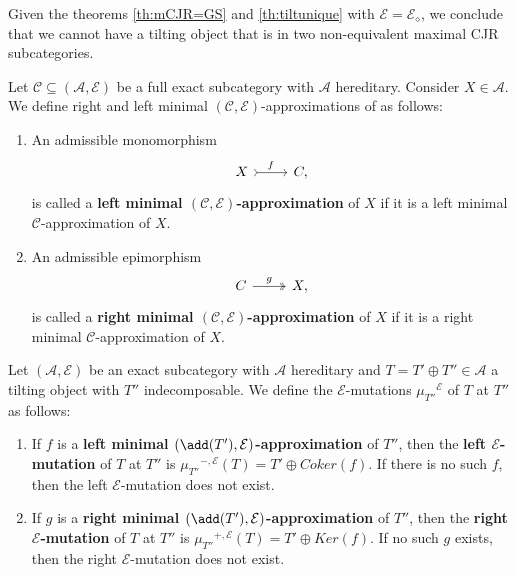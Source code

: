 Given the theorems \ref{th:mCJR=GS} and \ref{th:tiltunique} with $\mathcal{E} = \mathcal{E}_\diamond$, we conclude that we cannot have a tilting object that is in two non-equivalent maximal CJR subcategories.  

\begin{definition}
Let $\mathscr{C} \subseteq (\mathscr{A},\mathcal{E})$ be a full exact subcategory with $\mathscr{A}$ hereditary. Consider $X \in \mathscr{A}$. We define right and left minimal $(\mathscr{C},\mathcal{E})$-approximations of as follows:

\begin{enumerate}
    \item An admissible monomorphism 
    \[\begin{tikzcd}
	X & C,
	\arrow["f",tail,from=1-1, to=1-2]
	\end{tikzcd} \]
is called a \textbf{left minimal $(\mathscr{C},\mathcal{E})$-approximation} of $X$ if it is a left minimal $\mathscr{C}$-approximation of $X$. 

    \item An admissible epimorphism 
    \[\begin{tikzcd}
	C & X,
	\arrow["g",two heads,from=1-1, to=1-2]
	\end{tikzcd} \]
is called a \textbf{right minimal $(\mathscr{C},\mathcal{E})$-approximation} of $X$ if it is a right minimal $\mathscr{C}$-approximation of $X$. 
\end{enumerate}
\end{definition}

\begin{definition}
Let $(\mathscr{A},\mathcal{E})$ be an exact subcategory with $\mathscr{A}$ hereditary and $T = T' \oplus T''  \in \mathscr{A}$ a tilting object with $T''$ indecomposable. We define the $\mathcal{E}$-mutations ${\mu_{T''}}^\mathcal{E}$ of $T$ at $T''$ as follows: 

\begin{enumerate}
    \item If $f$ is a \textbf{left minimal $(\add(T'),\mathcal{E})$-approximation} of $T''$, then the \textbf{left $\mathcal{E}$-mutation} of $T$ at $T''$ is ${\mu_{T''}}^{-,\mathcal{E}}(T) = T' \oplus Coker(f)$. If there is no such $f$, then the left $\mathcal{E}$-mutation does not exist.
    \item If $g$ is a \textbf{right minimal $(\add(T'),\mathcal{E})$-approximation} of $T''$, then the \textbf{right $\mathcal{E}$-mutation} of $T$ at $T''$ is ${\mu_{T''}}^{+,\mathcal{E}}(T) = T' \oplus Ker(f)$. If no such $g$ exists, then the right $\mathcal{E}$-mutation does not exist.
\end{enumerate}

\end{definition}

